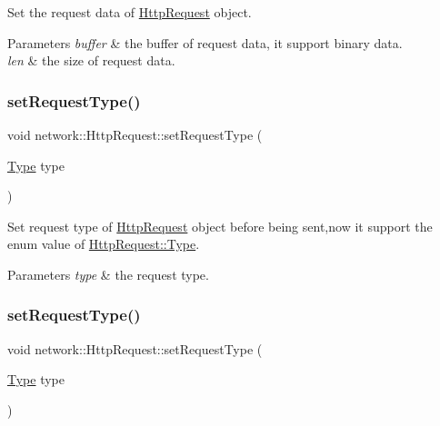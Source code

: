 Set the request data of \hyperlink{classnetwork_1_1HttpRequest}{Http\+Request} object.


\begin{DoxyParams}{Parameters}
{\em buffer} & the buffer of request data, it support binary data. \\
\hline
{\em len} & the size of request data. \\
\hline
\end{DoxyParams}
\mbox{\label{classnetwork_1_1HttpRequest_a07865a1628998a33a57e38cfe254e4cc}} 
\subsubsection{\texorpdfstring{set\+Request\+Type()}{setRequestType()}\hspace{0.1cm}{\footnotesize\ttfamily [1/2]}}
{\footnotesize\ttfamily void network\+::\+Http\+Request\+::set\+Request\+Type (\begin{DoxyParamCaption}\item[{\hyperlink{classnetwork_1_1HttpRequest_abcc6d7ee2ea91a721d32fd6d396743fe}{Type}}]{type }\end{DoxyParamCaption})\hspace{0.3cm}{\ttfamily [inline]}}

Set request type of \hyperlink{classnetwork_1_1HttpRequest}{Http\+Request} object before being sent,now it support the enum value of \hyperlink{classnetwork_1_1HttpRequest_abcc6d7ee2ea91a721d32fd6d396743fe}{Http\+Request\+::\+Type}.


\begin{DoxyParams}{Parameters}
{\em type} & the request type. \\
\hline
\end{DoxyParams}
\mbox{\label{classnetwork_1_1HttpRequest_a07865a1628998a33a57e38cfe254e4cc}} 
\subsubsection{\texorpdfstring{set\+Request\+Type()}{setRequestType()}\hspace{0.1cm}{\footnotesize\ttfamily [2/2]}}
{\footnotesize\ttfamily void network\+::\+Http\+Request\+::set\+Request\+Type (\begin{DoxyParamCaption}\item[{\hyperlink{classnetwork_1_1HttpRequest_abcc6d7ee2ea91a721d32fd6d396743fe}{Type}}]{type }\end{DoxyParamCaption})\hspace{0.3cm}{\ttfamily [inline]}}

